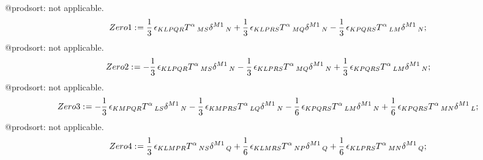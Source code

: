 \documentclass[11pt]{article}
\def\specialcolon{\mathrel{\mathop{:}}\hspace{-.5em}}
\begin{document}
@prodsort: not applicable.
\begin{dmath*}[compact, spread=2pt]
Zero1\specialcolon{}= \frac{1}{3}\, {\epsilon}_{K L P Q R} {T}^{\alpha}\,_{M S} {\delta}^{M1}\,_{N} + \frac{1}{3}\, {\epsilon}_{K L P R S} {T}^{\alpha}\,_{M Q} {\delta}^{M1}\,_{N} - \frac{1}{3}\, {\epsilon}_{K P Q R S} {T}^{\alpha}\,_{L M} {\delta}^{M1}\,_{N};
\end{dmath*}
@prodsort: not applicable.
\begin{dmath*}[compact, spread=2pt]
Zero2\specialcolon{}=  - \frac{1}{3}\, {\epsilon}_{K L P Q R} {T}^{\alpha}\,_{M S} {\delta}^{M1}\,_{N} - \frac{1}{3}\, {\epsilon}_{K L P R S} {T}^{\alpha}\,_{M Q} {\delta}^{M1}\,_{N} + \frac{1}{3}\, {\epsilon}_{K P Q R S} {T}^{\alpha}\,_{L M} {\delta}^{M1}\,_{N};
\end{dmath*}
@prodsort: not applicable.
\begin{dmath*}[compact, spread=2pt]
Zero3\specialcolon{}=  - \frac{1}{3}\, {\epsilon}_{K M P Q R} {T}^{\alpha}\,_{L S} {\delta}^{M1}\,_{N} - \frac{1}{3}\, {\epsilon}_{K M P R S} {T}^{\alpha}\,_{L Q} {\delta}^{M1}\,_{N} - \frac{1}{6}\, {\epsilon}_{K P Q R S} {T}^{\alpha}\,_{L M} {\delta}^{M1}\,_{N} + \frac{1}{6}\, {\epsilon}_{K P Q R S} {T}^{\alpha}\,_{M N} {\delta}^{M1}\,_{L};
\end{dmath*}
@prodsort: not applicable.
\begin{dmath*}[compact, spread=2pt]
Zero4\specialcolon{}= \frac{1}{3}\, {\epsilon}_{K L M P R} {T}^{\alpha}\,_{N S} {\delta}^{M1}\,_{Q} + \frac{1}{6}\, {\epsilon}_{K L M R S} {T}^{\alpha}\,_{N P} {\delta}^{M1}\,_{Q} + \frac{1}{6}\, {\epsilon}_{K L P R S} {T}^{\alpha}\,_{M N} {\delta}^{M1}\,_{Q};
\end{dmath*}
\end{document}
